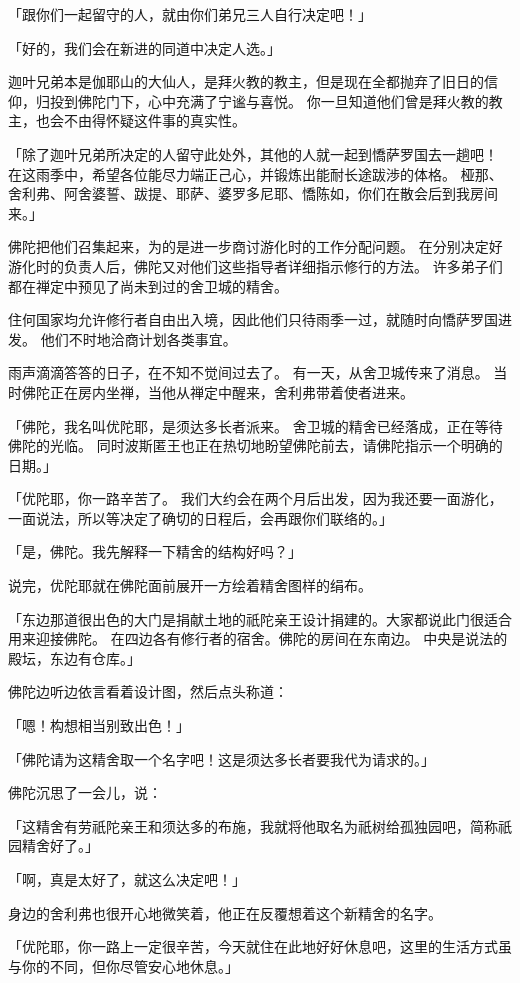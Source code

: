 \documentclass[twoside,openany]{book}
\begin{document}
「跟你们一起留守的人，就由你们弟兄三人自行决定吧！」

「好的，我们会在新进的同道中决定人选。」

迦叶兄弟本是伽耶山的大仙人，是拜火教的教主，但是现在全都抛弃了旧日的信仰，归投到佛陀门下，心中充满了宁谧与喜悦。
你一旦知道他们曾是拜火教的教主，也会不由得怀疑这件事的真实性。

「除了迦叶兄弟所决定的人留守此处外，其他的人就一起到憍萨罗国去一趟吧！
在这雨季中，希望各位能尽力端正己心，并锻炼出能耐长途跋渉的体格。
桠那、舍利弗、阿舍婆誓、跋提、耶萨、婆罗多尼耶、憍陈如，你们在散会后到我房间来。」

佛陀把他们召集起来，为的是进一步商讨游化时的工作分配问题。
在分别决定好游化时的负责人后，佛陀又对他们这些指导者详细指示修行的方法。
许多弟子们都在禅定中预见了尚未到过的舍卫城的精舍。

住何国家均允许修行者自由出入境，因此他们只待雨季一过，就随时向憍萨罗国进发。
他们不时地洽商计划各类事宜。

雨声滴滴答答的日子，在不知不觉间过去了。
有一天，从舍卫城传来了消息。
当时佛陀正在房内坐禅，当他从禅定中醒来，舍利弗带着使者进来。

「佛陀，我名叫优陀耶，是须达多长者派来。
舍卫城的精舍已经落成，正在等待佛陀的光临。
同时波斯匿王也正在热切地盼望佛陀前去，请佛陀指示一个明确的日期。」

「优陀耶，你一路辛苦了。
我们大约会在两个月后出发，因为我还要一面游化，一面说法，所以等决定了确切的日程后，会再跟你们联络的。」

「是，佛陀。我先解释一下精舍的结构好吗？」

说完，优陀耶就在佛陀面前展开一方绘着精舍图样的绢布。

「东边那道很出色的大门是捐献土地的祇陀亲王设计捐建的。大家都说此门很适合用来迎接佛陀。
在四边各有修行者的宿舍。佛陀的房间在东南边。
中央是说法的殿坛，东边有仓库。」

佛陀边听边依言看着设计图，然后点头称道：

「嗯！构想相当别致出色！」

「佛陀请为这精舍取一个名字吧！这是须达多长者要我代为请求的。」

佛陀沉思了一会儿，说：

「这精舍有劳祇陀亲王和须达多的布施，我就将他取名为祇树给孤独园吧，简称祇园精舍好了。」

「啊，真是太好了，就这么决定吧！」

身边的舍利弗也很开心地微笑着，他正在反覆想着这个新精舍的名字。

「优陀耶，你一路上一定很辛苦，今天就住在此地好好休息吧，这里的生活方式虽与你的不同，但你尽管安心地休息。」
\end{document}

